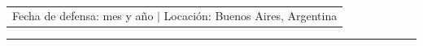 \documentclass[12pt]{article}
\begin{document}
\begin{titlepage}
\vfill

\begin{table}[h]
\hrulefill \\ 
\begin{tabular}{c}
Fecha de defensa: mes y año $\lvert$ Locación: Buenos Aires, Argentina \\
\end{tabular}
\end{table}
\hrule
\end{titlepage}

\newpage
\thispagestyle{empty} %
\mbox{} %
\newpage


\setcounter{page}{2} %
\setcounter{secnumdepth}{4}
\newpage 
\thispagestyle{plain} 


\clearpage

\newpage
\thispagestyle{plain} %
\mbox{} %
\newpage

\newpage
\thispagestyle{plain} 



\newpage
\renewcommand{\contentsname}{ÍNDICE DE CONTENIDOS}
\tableofcontents   %
\listoffigures  %
\listoftables   %



\newpage
\thispagestyle{plain} 

\end{document}
